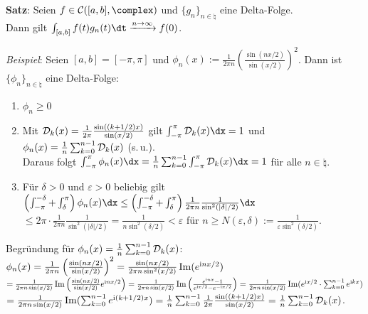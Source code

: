 \linie

\textbf{Satz}:
Seien $f \in \C([a, b], \complex)$ und $\{g_n\}_{n \in \natural}$
eine Delta-Folge.\\
Dann gilt $\int_{[a, b]} f(t)g_n(t) \dt \xrightarrow{n \to \infty} f(0)$.

\linie

\emph{Beispiel}:
Seien $[a, b] = [-\pi, \pi]$ und $\phi_n(x) :=
\frac{1}{2\pi n} \left(\frac{\sin(nx/2)}{\sin(x/2)}\right)^2$.
Dann ist $\{\phi_n\}_{n \in \natural}$ eine Delta-Folge:
\begin{enumerate}
    \item
    $\phi_n \ge 0$
    
    \item
    Mit $\mathcal{D}_k(x) = \frac{1}{2\pi} \frac{\sin((k + 1/2)x)}{\sin(x/2)}$
    gilt $\int_{-\pi}^\pi \D_k(x) \dx = 1$ und
    $\phi_n(x) = \frac{1}{n} \sum_{k=0}^{n-1} \mathcal{D}_k(x)$ (s.\,u.).\\
    Daraus folgt $\int_{-\pi}^\pi \phi_n(x)\dx =
    \frac{1}{n} \sum_{k=0}^{n-1} \int_{-\pi}^\pi \D_k(x) \dx = 1$
    für alle $n \in \natural$.
    
    \item
    Für $\delta > 0$ und $\varepsilon > 0$ beliebig gilt
    $\left(\int_{-\pi}^{-\delta} + \int_\delta^\pi\right) \phi_n(x)\dx \le
    \left(\int_{-\pi}^{-\delta} + \int_\delta^\pi\right)
    \frac{1}{2\pi n} \frac{1}{\sin^2(|\delta|/2)} \dx$\\
    $\le 2\pi \cdot \frac{1}{2\pi n} \frac{1}{\sin^2(|\delta|/2)} =
    \frac{1}{n \sin^2(\delta/2)} < \varepsilon$
    für $n \ge N(\varepsilon, \delta) :=
    \frac{1}{\varepsilon \sin^2(\delta/2)}$.
\end{enumerate}

\linie

Begründung für $\phi_n(x) = \frac{1}{n} \sum_{k=0}^{n-1} \mathcal{D}_k(x)$:
$\phi_n(x) = \frac{1}{2\pi n} \left(\frac{\sin(nx/2)}{\sin(x/2)}\right)^2 =
\frac{\sin(nx/2)}{2\pi n \sin^2(x/2)} \operatorname{Im}(e^{\mathrm{i} nx/2})$\\
$= \frac{1}{2\pi n \sin(x/2)}
\operatorname{Im}\left(\frac{\sin(nx/2)}{\sin(x/2)} e^{\mathrm{i} nx/2}\right) =
\frac{1}{2\pi n \sin(x/2)}
\operatorname{Im}\left(\frac{e^{\mathrm{i} nx} - 1}{e^{\mathrm{i} x/2} - e^{-\mathrm{i} x/2}}\right) =
\frac{1}{2\pi n \sin(x/2)} \operatorname{Im}(e^{\mathrm{i} x/2} \cdot \sum_{k=0}^{n-1} e^{\mathrm{i} kx})$\\
$= \frac{1}{2\pi n \sin(x/2)} \operatorname{Im}(\sum_{k=0}^{n-1} e^{\mathrm{i} (k + 1/2)x}) =
\frac{1}{n} \sum_{k=0}^{n-1} \frac{1}{2\pi}
\frac{\sin((k + 1/2)x)}{\sin(x/2)} =
\frac{1}{n} \sum_{k=0}^{n-1} \mathcal{D}_k(x)$.


